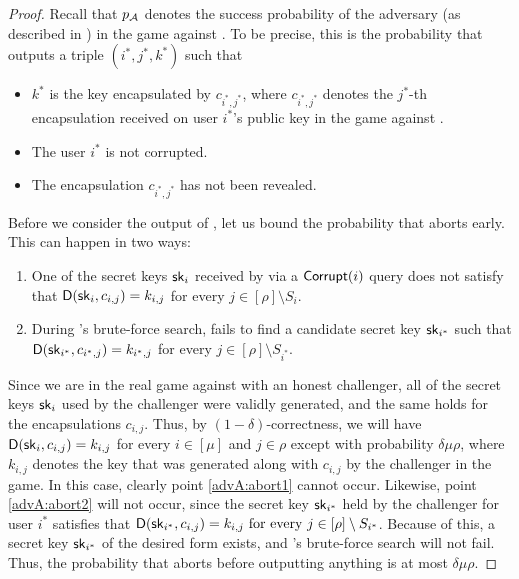 \begin{proof}
  Recall that \(p_{\mathcal{A}}\) denotes the success probability of the adversary \advA
  (as described in )
  in the \OWECPA game against \KEM.
  To be precise, this is the probability that \advA outputs a triple \((i^{*},j^{*},k^{*})\)
  such that
  \begin{itemize}[label={\textbullet},itemsep=0.1cm]
    \item \(k^{*}\) is the key encapsulated by \(c_{i^{*},j^{*}}\),
          where \(c_{i^{*},j^{*}}\) denotes the \(j^{*}\)-th encapsulation received on user \(i^{*}\)'s public key in the \OWECPA game against \KEM.
    \item The user \(i^{*}\) is not corrupted.
    \item The encapsulation \(c_{i^{*},j^{*}}\) has not been revealed.
  \end{itemize}

  Before we consider the output of \advA, let us bound
  the probability that \advA aborts early.
  This can happen in two ways:
  \begin{enumerate}
    \item\label{advA:abort1} One of the secret keys \(\mathsf{sk}_{i}\) received by \advA
          via a \(\mathsf{Corrupt}(i)\) query does not satisfy that \(\mathsf{D}(\mathsf{sk}_{i}, c_{i,j}) = k_{i,j}\)
          for every \(j \in [\rho] \setminus S_{i}\).
    \item\label{advA:abort2} During \advA's brute-force search, \advA fails to find a candidate secret key \(\mathsf{sk}_{i^{*}}\)
          such that \(\mathsf{D}(\mathsf{sk}_{i^{*}}, c_{i^{*},j}) = k_{i^{*},j}\) for every \(j \in [\rho] \setminus S_{i^{*}}\).
  \end{enumerate}
  Since we are in the real \OWECPA game against \KEM
  with an honest \OWECPA challenger,
  all of the secret keys \(\mathsf{sk}_{i}\) used by the challenger
  were validly generated, and the same holds for the encapsulations \(c_{i,j}\).
  Thus, by \((1 - \delta)\)-correctness,
  we will have \(\mathsf{D}(\mathsf{sk}_{i},c_{i,j}) = k_{i,j}\) for every \(i \in [\mu]\) and \(j \in \rho\)
  except with probability \(\delta \mu \rho\),
  where \(k_{i,j}\) denotes the key that was generated along with \(c_{i,j}\) by the challenger in the \OWECPA game.
  In this case, clearly point \ref{advA:abort1} cannot occur.
  Likewise, point \ref{advA:abort2} will not occur,
  since the secret key \(\mathsf{sk}_{i^{*}}\) held by the challenger for user \(i^{*}\)
  satisfies that \(\mathsf{D}(\mathsf{sk}_{i^{*}}, c_{i,j}) = k_{i,j} \text{ for every } j \in [\rho] \setminus S_{i^{*}}\).
  Because of this, a secret key \(\mathsf{sk}_{i^{*}}\) of the desired form exists,
  and \advA's brute-force search will not fail.
  Thus, the probability that \advA aborts before outputting anything is at most \(\delta \mu \rho\).


\end{proof}
